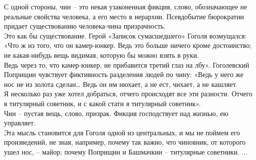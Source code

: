 \documentclass[12pt,a4paper]{article}
\begin{document}
С одной стороны, чин – это некая узаконенная фикция,
слово, обозначающее не реальные свойства человека, а его
место в иерархии. Псевдобытие бюрократии придает
существованию человека-чина призрачность.\\ Это как бы
существование. Герой «Записок сумасшедшего» Гоголя
возмущался: «Что ж из того, что он камер-юнкер. Ведь это
больше ничего кроме достоинство; не какая-нибудь
вещь видимая, которую бы можно взять в руки.\\ Ведь через
то, что камер-юнкер, не прибавится третий глаз на лбу».
Гоголевский Поприщин чувствует фиктивность разделения
людей по чину: «Ведь у него же нос не из золота сделан…
Ведь он им нюхает, а не ест, чихает, а не кашляет.\\
Я несколько раз уже хотел добраться, отчего происходят все
эти разности. Отчего я титулярный советник, и с какой стати
я титулярный советник».\\ Чин – пустая вещь, слово, призрак.
Фикция господствует над жизнью, ею управляет.\\ Эта мысль
становится для Гоголя одной из центральных, и мы не
поймем его произведений, не зная, например, почему так
важно, что чиновник, от которого ушел нос, – майор; почему
Поприщин и Башмачкин – титулярные советники.
...
\end{document}
